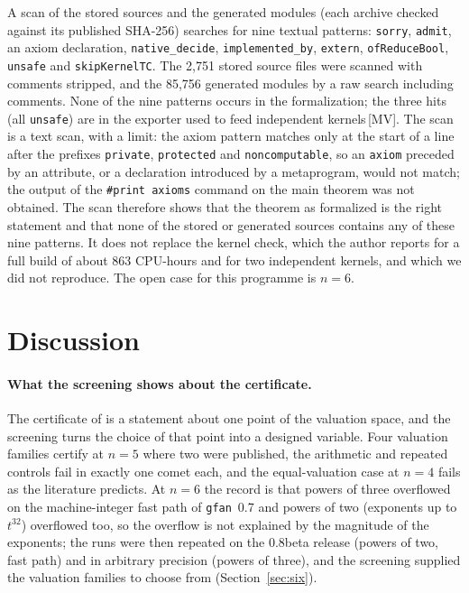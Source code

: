 \documentclass[11pt]{article}
\theoremstyle{definition}
\theoremstyle{remark}
\newcommand{\mk}[1]{\,{\scriptsize[#1]}}
\newcommand{\MV}{\mk{MV}}
\begin{document}
A scan of the stored sources and the generated modules (each archive checked against its published SHA-256) searches
for nine textual patterns: \texttt{sorry}, \texttt{admit}, an axiom declaration, \texttt{native\_decide},
\texttt{implemented\_by}, \texttt{extern}, \texttt{ofReduceBool}, \texttt{unsafe} and \texttt{skipKernelTC}. The 2,751 stored
source files were scanned with comments stripped, and the 85,756 generated modules by a raw search including comments. None of the nine
patterns occurs in the formalization; the three hits (all \texttt{unsafe}) are in the exporter used to feed
independent kernels\MV. The scan is a text scan, with a limit: the axiom pattern matches only at the start of a line after
the prefixes \texttt{private}, \texttt{protected} and \texttt{noncomputable}, so an \texttt{axiom} preceded by an
attribute, or a declaration introduced by a metaprogram, would not match; the output of the \texttt{\#print axioms} command
on the main theorem was not obtained. The scan therefore shows that the theorem as formalized is the right statement and that
none of the stored or generated sources contains any of these nine patterns. It does not replace the kernel check, which the
author reports for a full build of about 863 CPU-hours and for two independent kernels, and which we did not reproduce.
The open case for this programme is $n=6$.

\FloatBarrier

\section{Discussion}\label{sec:discussion}

\paragraph{What the screening shows about the certificate.}
The certificate of \cite{JL25} is a statement about one point of the valuation space, and the screening turns the choice of that point into a designed variable.
Four valuation families certify at $n=5$ where two were published, the arithmetic and repeated controls fail in exactly one comet each, and the
equal-valuation case at $n=4$ fails as the literature predicts. At $n=6$ the record is that powers of three overflowed on the machine-integer fast path of \texttt{gfan}~0.7 and powers of two (exponents up to $t^{32}$) overflowed too, so the
overflow is not explained by the magnitude of the exponents; the runs were then repeated on the 0.8beta release (powers of two, fast path) and in arbitrary precision
(powers of three), and the screening supplied the valuation families to choose from (Section~\ref{sec:six}).
\end{document}

